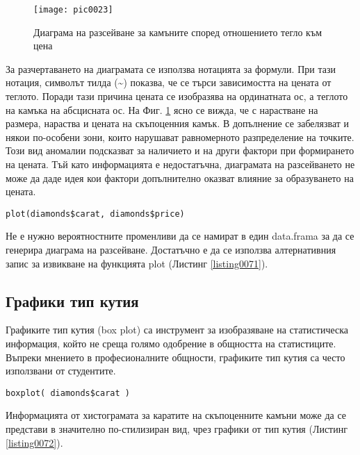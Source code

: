 \begin{figure}[h!]
  \centering
  \texttt{[image: pic0023]}
  \caption{Диаграма на разсейване за камъните според отношението тегло към цена}
\label{figure0023}
\end{figure}
\FloatBarrier

За разчертаването на диаграмата се използва нотацията за формули. При тази нотация, символът тилда (\textasciitilde) показва, че се търси зависимостта  на цената от теглото. Поради тази причина цената се изобразява на ординатната ос, а теглото на камъка на абсцисната ос. На Фиг. \ref{figure0023} ясно се вижда, че с нарастване на размера, нараства и цената на скъпоценния камък. В допълнение се забелязват и някои по-особени зони, които нарушават равномерното разпределение на точките. Този вид аномалии подсказват за наличието и на други фактори при формирането на цената. Тъй като информацията е недостатъчна, диаграмата на разсейването не може да даде идея кои фактори допълнително оказват влияние за образуването на цената.

\begin{lstlisting}[caption=Алтернативна команда за диаграма на разсейване, label=listing0071]
plot(diamonds$carat, diamonds$price)
\end{lstlisting}

Не е нужно вероятностните променливи да се намират в един data.frama за да се генерира диаграма на разсейване. Достатъчно е да се използва алтернативния запис за извикване на функцията plot (Листинг \ref{listing0071}).

\subsection{Графики тип кутия}

Графиките тип кутия (box plot) са инструмент за изобразяване на статистическа информация, който не среща голямо одобрение в общността на статистиците. Въпреки мнението в професионалните общности, графиките тип кутия са често използвани от студентите.

\begin{lstlisting}[caption=Генериране на графика от тип кутия, label=listing0072]
boxplot( diamonds$carat )
\end{lstlisting}

Информацията от хистограмата за каратите на скъпоценните камъни може да се представи в значително по-стилизиран вид, чрез графики от тип кутия (Листинг \ref{listing0072}).


